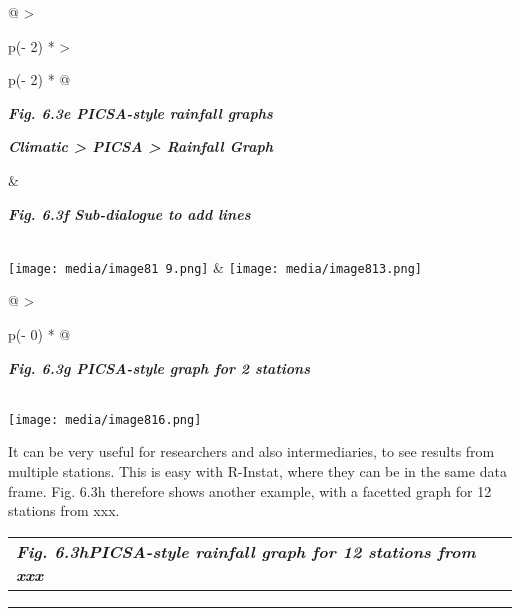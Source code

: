 \documentclass[
  letterpaper,
  DIV=11,
  numbers=noendperiod]{scrreprt}
\begin{document}
\begin{longtable}[]{@{}
  >{\raggedright\arraybackslash}p{(\columnwidth - 2\tabcolsep) * }
  >{\raggedright\arraybackslash}p{(\columnwidth - 2\tabcolsep) * }@{}}
\toprule\noalign{}
\begin{minipage}[b]{\linewidth}\raggedright
\textbf{\emph{Fig. 6.3e PICSA-style rainfall graphs}}

\textbf{\emph{Climatic \textgreater{} PICSA \textgreater{} Rainfall
Graph}}
\end{minipage} & \begin{minipage}[b]{\linewidth}\raggedright
\textbf{\emph{Fig. 6.3f Sub-dialogue to add lines}}
\end{minipage} \\
\midrule\noalign{}
\endhead
\bottomrule\noalign{}
\endlastfoot
\texttt{[image: media/image81 9.png]}
&
\texttt{[image: media/image813.png]} \\
\end{longtable}

\begin{longtable}[]{@{}
  >{\raggedright\arraybackslash}p{(\columnwidth - 0\tabcolsep) * }@{}}
\toprule\noalign{}
\begin{minipage}[b]{\linewidth}\raggedright
\textbf{\emph{Fig. 6.3g PICSA-style graph for 2 stations}}
\end{minipage} \\
\midrule\noalign{}
\endhead
\bottomrule\noalign{}
\endlastfoot
\texttt{[image: media/image816.png]} \\
\end{longtable}

It can be very useful for researchers and also intermediaries, to see
results from multiple stations. This is easy with R-Instat, where they
can be in the same data frame. Fig. 6.3h therefore shows another
example, with a facetted graph for 12 stations from xxx.

\begin{longtable}[]{@{}l@{}}
\toprule\noalign{}
\endhead
\bottomrule\noalign{}
\endlastfoot
\textbf{\emph{Fig. 6.3hPICSA-style rainfall graph for 12 stations from
xxx}} \\
\end{longtable}

\begin{center}\rule{0.5\linewidth}{0.5pt}\end{center}
\end{document}
